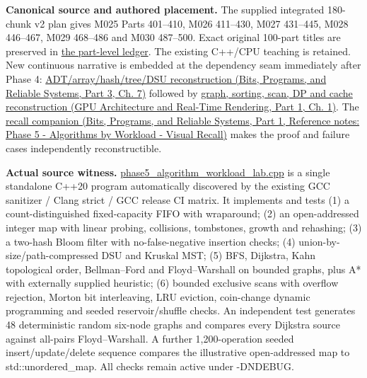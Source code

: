 \hypertarget{appendix-a103e7846d21-phase-10-algorithms-chosen-by-workload-m025m030-parts-401500}{}

\textbf{Canonical source and authored placement.} The supplied integrated 180-chunk v2 plan gives M025 Parts 401--410, M026 411--430, M027 431--445, M028 446--467, M029 468--486 and M030 487--500. Exact original 100-part titles are preserved in \hyperref[appendix-fd090d982a15-phase-5-algorithms-and-data-structure-workload-contracts-parts-401500]{the part-level ledger}. The existing C++/CPU teaching is retained. New continuous narrative is embedded at the dependency seam immediately after Phase 4: \href{../01-Bits-Programs-and-Reliable-Systems-P03/main.pdf\#nameddest=01-foundations-i-ch007-the-scene-is-now-too-large-for-the-wrong-container-phase-5-m025m027-parts-401445}{ADT/array/hash/tree/DSU reconstruction (Bits, Programs, and Reliable Systems, Part 3, Ch. 7)} followed by \href{../06-GPU-Architecture-and-Real-Time-Rendering-P01/main.pdf\#nameddest=01-foundations-i-ch008-from-an-asset-map-to-a-correct-navigable-world-phase-5-m028m030-parts-446500}{graph, sorting, scan, DP and cache reconstruction (GPU Architecture and Real-Time Rendering, Part 1, Ch. 1)}. The \href{../01-Bits-Programs-and-Reliable-Systems-P01/main.pdf\#nameddest=appendix-8a046b38375e}{recall companion (Bits, Programs, and Reliable Systems, Part 1, Reference notes: Phase 5 - Algorithms by Workload - Visual Recall)} makes the proof and failure cases independently reconstructible.

\textbf{Actual source witness.} \hyperref[source-file-0ec69e1a1a11439bca29faa5]{phase5\_algorithm\_workload\_lab.cpp} is a single standalone C++20 program automatically discovered by the existing GCC sanitizer / Clang strict / GCC release CI matrix. It implements and tests (1) a count-distinguished fixed-capacity FIFO with wraparound; (2) an open-addressed integer map with linear probing, collisions, tombstones, growth and rehashing; (3) a two-hash Bloom filter with no-false-negative insertion checks; (4) union-by-size/path-compressed DSU and Kruskal MST; (5) BFS, Dijkstra, Kahn topological order, Bellman--Ford and Floyd--Warshall on bounded graphs, plus A* with externally supplied heuristic; (6) bounded exclusive scans with overflow rejection, Morton bit interleaving, LRU eviction, coin-change dynamic programming and seeded reservoir/shuffle checks. An independent test generates 48 deterministic random six-node graphs and compares every Dijkstra source against all-pairs Floyd--Warshall. A further 1,200-operation seeded insert/update/delete sequence compares the illustrative open-addressed map to std::unordered\_map. All checks remain active under -DNDEBUG.

